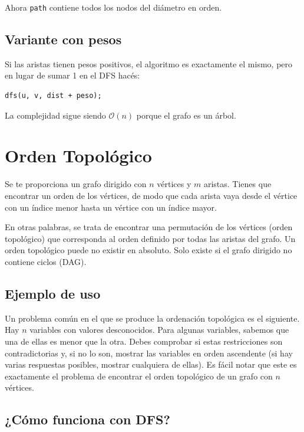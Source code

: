 Ahora \texttt{path} contiene todos los nodos del diámetro en orden.

\subsection*{Variante con pesos}

Si las aristas tienen pesos positivos, el algoritmo es exactamente el mismo, pero en lugar de sumar 1 en el DFS hacés:

\begin{lstlisting}[caption=DFS con pesos]
	dfs(u, v, dist + peso);
\end{lstlisting}

La complejidad sigue siendo $\mathcal{O}(n)$ porque el grafo es un árbol.


\section{Orden Topológico}

Se te proporciona un grafo dirigido con $n$ vértices y $m$ aristas. Tienes que encontrar un orden de los vértices, de modo que cada arista vaya desde el vértice con un índice menor hasta un vértice con un índice mayor.

En otras palabras, se trata de encontrar una permutación de los vértices (orden topológico) que corresponda al orden definido por todas las aristas del grafo. Un orden topológico puede no existir en absoluto. Solo existe si el grafo dirigido no contiene ciclos (DAG).

\subsection*{Ejemplo de uso}

Un problema común en el que se produce la ordenación topológica es el siguiente. Hay $n$ variables con valores desconocidos. Para algunas variables, sabemos que una de ellas es menor que la otra. Debes comprobar si estas restricciones son contradictorias y, si no lo son, mostrar las variables en orden ascendente (si hay varias respuestas posibles, mostrar cualquiera de ellas). Es fácil notar que este es exactamente el problema de encontrar el orden topológico de un grafo con $n$ vértices.

\subsection*{¿Cómo funciona con DFS?}

